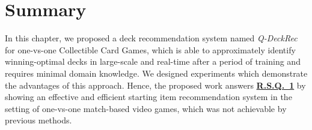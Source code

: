 \section{Summary}\label{sec:conclusion}
In this chapter, we proposed a deck recommendation system named \textit{Q-DeckRec} for one-vs-one Collectible Card Games, which is able to approximately identify winning-optimal decks in large-scale and real-time after a period of training and requires minimal domain knowledge. We designed experiments which demonstrate the advantages of this approach. Hence, the proposed work answers \hyperref[rq1]{\textbf{R.S.Q.~1}} by showing an effective and efficient starting item recommendation system in the setting of one-vs-one match-based video games, which was not achievable by previous methods.











